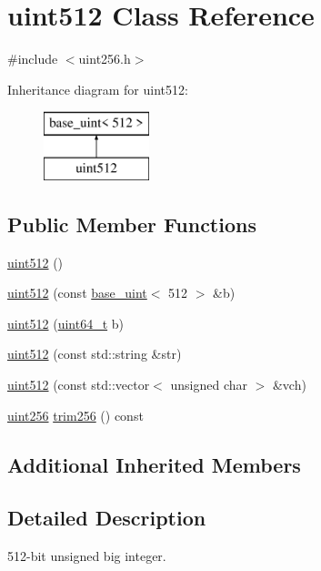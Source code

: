 \hypertarget{classuint512}{}\section{uint512 Class Reference}
\label{classuint512}


{\ttfamily \#include $<$uint256.\+h$>$}

Inheritance diagram for uint512\+:\begin{figure}[H]
\begin{center}
\leavevmode
\includegraphics[height=2.000000cm]{classuint512}
\end{center}
\end{figure}
\subsection*{Public Member Functions}
\begin{DoxyCompactItemize}
\item 
\hyperlink{classuint512_afc3f70aa77709d87371f7a018e5410be}{uint512} ()
\item 
\hyperlink{classuint512_a7650e39f0ddd7401d6f9edb70cc30715}{uint512} (const \hyperlink{classbase__uint}{base\+\_\+uint}$<$ 512 $>$ \&b)
\item 
\hyperlink{classuint512_a9b0342e991f4a3f858c9744a671b83d2}{uint512} (\hyperlink{stdint_8h_aaa5d1cd013383c889537491c3cfd9aad}{uint64\+\_\+t} b)
\item 
\hyperlink{classuint512_a407d2a7a59005a57e848327014c7d2b5}{uint512} (const std\+::string \&str)
\item 
\hyperlink{classuint512_a017c6e9933a94a0d9b2eb2fff280065a}{uint512} (const std\+::vector$<$ unsigned char $>$ \&vch)
\item 
\hyperlink{classuint256}{uint256} \hyperlink{classuint512_adbe0526a9ef6eedc10a530834b4ab89a}{trim256} () const 
\end{DoxyCompactItemize}
\subsection*{Additional Inherited Members}


\subsection{Detailed Description}
512-\/bit unsigned big integer. 

